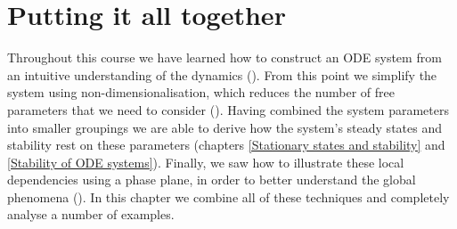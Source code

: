 \chapter{Putting it all together}
Throughout this course we have learned how to construct an ODE system from an intuitive understanding of the dynamics (). From this point we simplify the system using non-dimensionalisation, which reduces the number of free parameters that we need to consider (). Having combined the system parameters into smaller groupings we are able to derive how the system's steady states and stability rest on these parameters (chapters \ref{Stationary states and stability} and \ref{Stability of ODE systems}). Finally, we saw how to illustrate these local dependencies using a phase plane, in order to better understand the global phenomena (). In this chapter we combine all of these techniques and completely analyse a number of examples.

